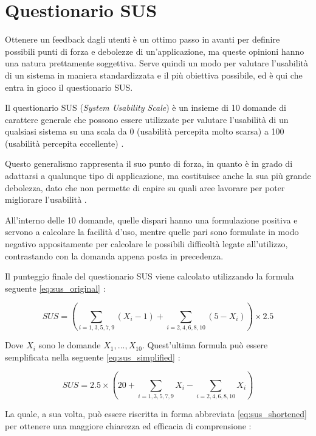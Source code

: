 \section{Questionario SUS}
Ottenere un feedback dagli utenti è un ottimo passo in avanti per definire possibili punti di forza e debolezze di un'applicazione, ma queste opinioni hanno una natura prettamente soggettiva. Serve quindi un modo per valutare l'usabilità di un sistema in maniera standardizzata e il più obiettiva possibile, ed è qui che entra in gioco il questionario SUS.

Il questionario SUS (\textit{System Usability Scale}) è un insieme di 10 domande di carattere generale che possono essere utilizzate per valutare l'usabilità di un qualsiasi sistema su una scala da 0 (usabilità percepita molto scarsa) a 100 (usabilità percepita eccellente) \cite{SUS}.

Questo generalismo rappresenta il suo punto di forza, in quanto è in grado di adattarsi a qualunque tipo di applicazione, ma costituisce anche la sua più grande debolezza, dato che non permette di capire su quali aree lavorare per poter migliorare l'usabilità \cite{SUS}.

All'interno delle 10 domande, quelle dispari hanno una formulazione positiva e servono a calcolare la facilità d'uso, mentre quelle pari sono formulate in modo negativo appositamente per calcolare le possibili difficoltà legate all'utilizzo, contrastando con la domanda appena posta in precedenza.

Il punteggio finale del questionario SUS viene calcolato utilizzando la formula seguente \eqref{eq:sus_original} \cite{SUS_DesignersItalia}:

\begin{equation}
    SUS = \left( \sum_{i=1,3,5,7,9} (X_i - 1) + \sum_{i=2,4,6,8,10} (5 - X_i) \right) \times 2.5
    \label{eq:sus_original}
\end{equation}

Dove \( X_i \) sono le domande \( X_1, ..., X_{10} \). Quest'ultima formula può essere semplificata nella seguente \eqref{eq:sus_simplified} \cite{SUS_Wikipedia}:

\begin{equation}
    SUS = 2.5 \times \left( 20 + \sum_{i=1,3,5,7,9} X_i - \sum_{i=2,4,6,8,10} X_i \right)
    \label{eq:sus_simplified}
\end{equation}

La quale, a sua volta, può essere riscritta in forma abbreviata \eqref{eq:sus_shortened} per ottenere una maggiore chiarezza ed efficacia di comprensione \cite{SUS_Wikipedia}:

